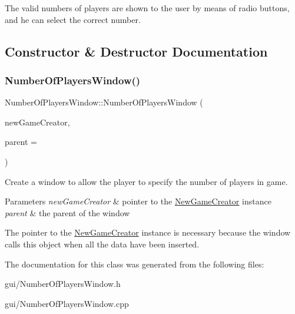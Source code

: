 The valid numbers of players are shown to the user by means of radio buttons, and he can select the correct number. 

\subsection{Constructor \& Destructor Documentation}
\mbox{\label{classNumberOfPlayersWindow_a522ce7de553a78ef1514cc988abb8d38}} 
\subsubsection{\texorpdfstring{Number\+Of\+Players\+Window()}{NumberOfPlayersWindow()}}
{\footnotesize\ttfamily Number\+Of\+Players\+Window\+::\+Number\+Of\+Players\+Window (\begin{DoxyParamCaption}\item[{\hyperlink{classNewGameCreator}{New\+Game\+Creator} $\ast$}]{new\+Game\+Creator,  }\item[{Q\+Widget $\ast$}]{parent = {} }\end{DoxyParamCaption})\hspace{0.3cm}{\ttfamily [explicit]}}



Create a window to allow the player to specify the number of players in game. 


\begin{DoxyParams}{Parameters}
{\em new\+Game\+Creator} & pointer to the \hyperlink{classNewGameCreator}{New\+Game\+Creator} instance \\
\hline
{\em parent} & the parent of the window\\
\hline
\end{DoxyParams}
The pointer to the \hyperlink{classNewGameCreator}{New\+Game\+Creator} instance is necessary because the window calls this object when all the data have been inserted. 

The documentation for this class was generated from the following files\+:\begin{DoxyCompactItemize}
\item 
gui/Number\+Of\+Players\+Window.\+h\item 
gui/Number\+Of\+Players\+Window.\+cpp\end{DoxyCompactItemize}
